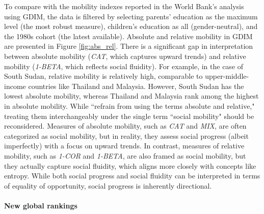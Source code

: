 To compare with the mobility indexes reported in the World Bank's analysis using GDIM, the data is filtered by selecting parents' education as the maximum level (the most robust measure), children's education as all (gender-neutral), and the 1980s cohort (the latest available). Absolute and relative mobility in GDIM are presented in Figure \ref{fig:abs_rel}. There is a significant gap in interpretation between absolute mobility (\textit{CAT}, which captures upward trends) and relative mobility (\textit{1-BETA}, which reflects social fluidity). For example, in the case of South Sudan, relative mobility is relatively high, comparable to upper-middle-income countries like Thailand and Malaysia. However, South Sudan has the lowest absolute mobility, whereas Thailand and Malaysia rank among the highest in absolute mobility. While \citet{van2024intergenerational} ``refrain from using the terms absolute and relative," treating them interchangeably under the single term ``social mobility" should be reconsidered. Measures of absolute mobility, such as \textit{CAT} and \textit{MIX}, are often categorized as social mobility, but in reality, they assess social progress (albeit imperfectly) with a focus on upward trends. In contrast, measures of relative mobility, such as \textit{1-COR} and \textit{1-BETA}, are also framed as social mobility, but they actually capture social fluidity, which aligns more closely with concepts like entropy. While both social progress and social fluidity can be interpreted in terms of equality of opportunity, social progress is inherently directional.

\paragraph{New global rankings}

